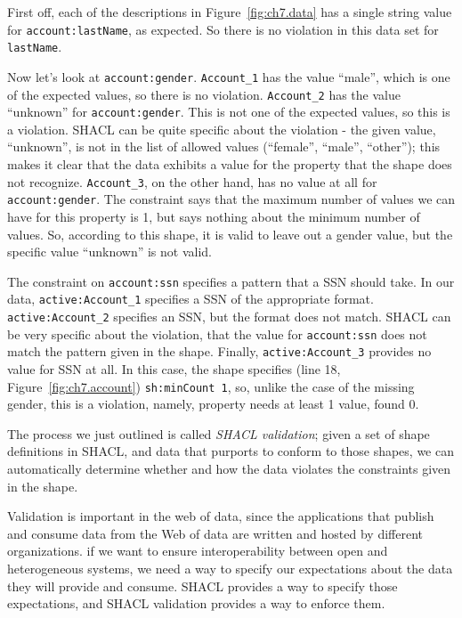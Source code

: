 First off, each of the descriptions in Figure~\ref{fig:ch7.data} has a single string value for
\texttt{account:lastName}, as expected.  So there is no violation in this data set for \texttt{lastName}.

Now let's look at \texttt{account:gender}.  \texttt{Account\_1} has the
value ``male'', which is one of the expected values, so there is no
violation.  \texttt{Account\_2} has the value ``unknown'' for \texttt{account:gender}.  This is not one 
of the expected values, so this is a violation.  SHACL can be quite specific about
the violation - the given value, ``unknown'', is not in the list of allowed
values (``female'', ``male'', ``other''); this makes it clear that the data exhibits a value
for the property that the shape does not recognize. \texttt{Account\_3}, on the other hand, has 
no value at all for \texttt{account:gender}.  The constraint says that the
maximum number of values we can have for this property is 1, but says nothing about the
minimum number of values.  So, according to this shape, it is valid to leave out a gender value,
but the specific value ``unknown'' is not valid.  

The constraint on \texttt{account:ssn} specifies a pattern that a SSN should take.
In our data, \texttt{active:Account\_1} specifies a SSN of the appropriate format.
\texttt{active:Account\_2} specifies an SSN, but the format does not match.  SHACL can
be very specific about the violation, that the value for \texttt{account:ssn}
does not match the pattern given in the shape.  Finally, \texttt{active:Account\_3}  provides no value for SSN at all.  In this case, the shape specifies (line 18, Figure~\ref{fig:ch7.account}) \texttt{sh:minCount 1}, so, unlike the case of the missing
gender, this is a violation, namely, property needs at least 1 value, found 0.

The process we just outlined is called \emph{SHACL validation}; given a set of
shape definitions in SHACL, and data that purports to conform to those shapes,
we can automatically determine whether and how the data violates the constraints
given in the shape.

Validation is important in the web of data, since the applications
that publish and consume data from the Web of data are  written and
hosted by different organizations.  if we want to ensure
interoperability between open and heterogeneous systems, we need a way
to specify our expectations about the data they will provide and
consume.  SHACL provides a way to specify those expectations, and
SHACL validation provides a way to enforce them.




